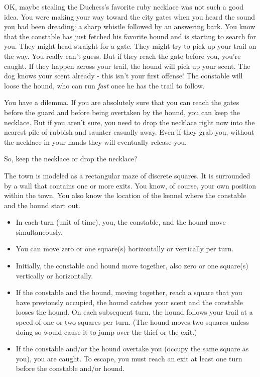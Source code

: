

OK, maybe stealing the Duchess's favorite ruby necklace was not such a
good idea. You were making your way toward the city gates when you
heard the sound you had been dreading: a sharp whistle followed by an
answering bark. You know that the constable has just fetched his
favorite hound and is starting to search for you.  They might head
straight for a gate. They might try to pick up your trail on the
way. You really can't guess. But if they reach the gate before you,
you're caught. If they happen across your trail, the hound will pick
up your scent. The dog knows your scent already - this isn't your
first offense!  The constable will loose the hound, who can
run \textit{fast} once he has the trail to follow.

You have a dilemma. If you are absolutely sure that you can
reach the gates before the guard and before being overtaken by the
hound, you can keep the necklace. But if you aren't sure, you need to drop
the necklace right now into the nearest pile of rubbish and saunter
casually away. Even if they grab you, without the necklace in your
hands they will eventually release you.

So, keep the necklace or drop the necklace?

\hrulefill

The town is modeled as a rectangular maze of discrete squares.  It is
surrounded by a wall that contains one or more exits. You know, of
course, your own position within the town. You also know the location
of the kennel where the constable and the hound start out.

\begin{itemize}

\item In each turn (unit of time), you, the constable, and the hound 
move simultaneously. 

\item You can move zero or one square(s) horizontally or vertically per turn.

\item Initially, the constable and hound move together, also zero or 
one square(s) vertically or horizontally.

\item If the constable and the hound, moving together, reach a square
that you have previously occupied, the hound catches your scent and
the constable looses the hound. On each subsequent turn, the hound
follows your trail at a speed of one or two squares per turn. (The hound
moves two squares unless doing so would cause it to jump over the
thief or the exit.)

\item If the constable and/or the hound overtake you  (occupy the same
square as you), you are caught. To escape, you must reach an exit at
least one turn before the constable and/or hound.

\end{itemize}

